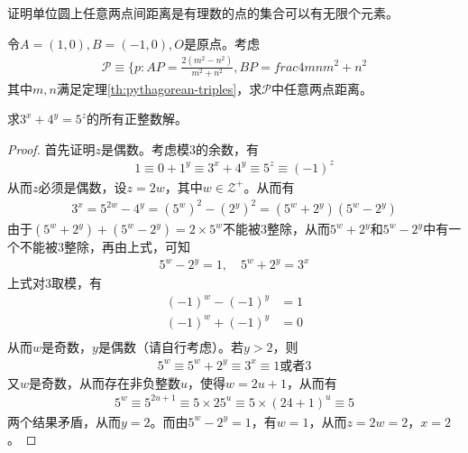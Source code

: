 \begin{example}[1975 IMO]
  证明单位圆上任意两点间距离是有理数的点的集合可以有无限个元素。
\end{example}

\hints 令$A=(1,0),B=(-1,0),O$是原点。考虑
\begin{align*}
  \mathcal{P}\equiv\{p:AP=\frac{2(m^2-n^2)}{m^2+n^2}, BP=frac{4mn}{m^2+n^2}
\end{align*}
其中$m,n$满足定理\ref{th:pythagorean-triples}，求$\mathcal{P}$中任意两点距离。

\begin{example}
  求$3^x+4^y=5^z$的所有正整数解。
\end{example}

\begin{proof}
  首先证明$z$是偶数。考虑模3的余数，有
  \begin{align*}
    1 \equiv 0 + 1^y \equiv 3^x + 4^y \equiv 5^z \equiv (-1)^z \tag*{$\pmod 3$}
  \end{align*}
  从而$z$必须是偶数，设$z=2w$，其中$w\in\mathcal{Z}^+$。从而有
  \begin{align*}
    3^x = 5^{2w} - 4^y = \left(5^w\right)^2 - \left(2^y\right)^2 = \left(5^w + 2^y\right)\left(5^w - 2^y\right)
  \end{align*}
  由于$(5^w + 2^y) + (5^w - 2^y) = 2\times 5^w$不能被3整除，从而$5^w + 2^y$和$5^w - 2^y$中有一个不能被3整除，再由上式，可知
  \begin{align*}
    5^w-2^y =1,\quad 5^w+2^y =3^x
  \end{align*}
  上式对3取模，有
  \begin{align*}
    (-1)^w - (-1)^y &= 1 \tag*{$\pmod 3$}\\
    (-1)^w + (-1)^y &= 0 \tag*{$\pmod 3$}\\
  \end{align*}
  从而$w$是奇数，$y$是偶数（请自行考虑）。若$y>2$，则
  \begin{align*}
     5^w\equiv 5^w+2^y \equiv 3^x \equiv 1\text{或者}3 \tag*{$\pmod 8$}
  \end{align*}
  又$w$是奇数，从而存在非负整数$u$，使得$w=2u + 1$，从而有
  \begin{align*}
    5^w \equiv 5^{2u + 1} \equiv 5\times 25^u \equiv 5\times (24 + 1)^u \equiv 5 \tag*{$\pmod 8$}
  \end{align*}
  两个结果矛盾，从而$y=2$。而由$5^w-2^y=1$，有$w=1$，从而$z=2w=2$，$x=2$。
\end{proof}